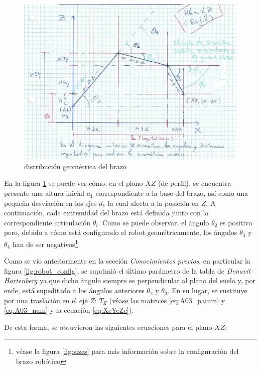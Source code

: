 \documentclass[a4paper,12pt]{article}
\begin{document}
\begin{figure}[H]
    \centering
    \includegraphics[width=.8\linewidth]{images/ik_geometry.png}
    \caption{distribución geométrica del brazo}
    \label{fig:ik_geometry}
\end{figure}

En la figura \ref{fig:ik_geometry} se puede ver cómo, en el plano $XZ$ (de perfil),
se encuentra presente una altura inicial $a_1$ correspondiente a la base del brazo,
así como una pequeña desviación en los ejes $d_1$ la cual afecta a la posición en $Z$.
A continuación, cada extremidad del brazo está definida junto con la correspondiente
articulación $\theta_i$. Como se puede observar, el ángulo $\theta_2$ es positivo pero,
debido a cómo está configurado el robot geométricamente, los ángulos $\theta_3$ y
$\theta_4$ han de ser negativos\footnote{véase la figura \ref{fig:sizes} para más
    información sobre la configuración del brazo robótico}.

Como se vio anteriormente en la sección \textit{Conocimientos previos},
en particular la figura \ref{fig:robot_config}, se suprimió el último parámetro de la
tabla de \textit{Denavit–Hartenberg} ya que dicho ángulo siempre es perpendicular al
plano del suelo y, por ende, está supeditado a los ángulos anteriores $\theta_2$ y
$\theta_3$. En su lugar, se sustituye por una traslación en el eje $Z$: $T_Z$ (véase
las matrices \ref{eq:A03_param} y \ref{eq:A03_num} y la ecuación \ref{eq:XeYeZe}).

De esta forma, se obtuvieron las siguientes ecuaciones para el plano $XZ$:
\end{document}
